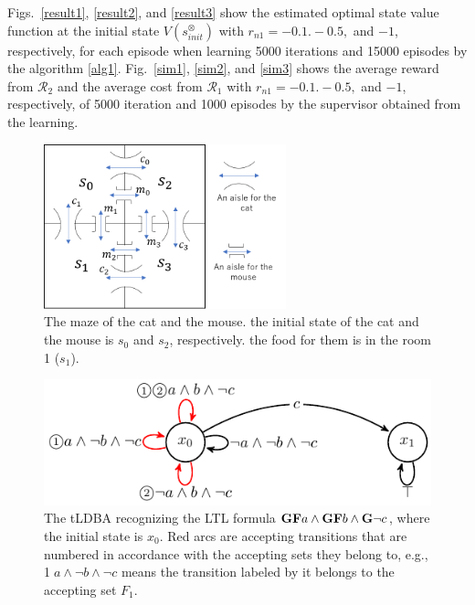 \documentclass[letterpaper, 10 pt, conference, dvipdfmx]{ieeeconf}
\begin{document}
Figs.\ \ref{result1}, \ref{result2}, and \ref{result3} show the estimated optimal state value function at the initial state $V(s^{\otimes}_{init})$ with $r_{n1} = -0.1. -0.5,$ and $-1$, respectively, for each episode when learning 5000 iterations and 15000 episodes by the algorithm \ref{alg1}.
Fig.\ \ref{sim1}, \ref{sim2}, and \ref{sim3} shows the average reward from $\mathcal{R}_2$ and the average cost from $\mathcal{R}_1$ with $r_{n1} = -0.1. -0.5,$ and $-1$, respectively, of 5000 iteration and 1000 episodes by the supervisor obtained from the learning.

\begin{figure}[htbp]
   \centering
   \vspace{2mm}
   \includegraphics[width=7cm]{cat_mouse.png}
   \caption{The maze of the cat and the mouse. the initial state of the cat and the mouse is $s_0$ and $s_2$, respectively. the food for them is in the room 1 ($s_1$).}
   \label{cat_mouse}
\end{figure}

\begin{figure}[htbp]
   \centering
   \vspace{2mm}
   \includegraphics[bb=0 0 247 80,scale=0.85]{ldgba_original.pdf}
   \caption{The tLDBA recognizing the LTL formula $\text{{\bf GF}}a \wedge \text{{\bf GF}}b \wedge \text{{\bf G}}\neg c$, where the initial state is $x_0$. Red arcs are accepting transitions that are numbered in accordance with the accepting sets they belong to, e.g., \textcircled{\scriptsize 1}$a \land \neg b \land \neg c$ means the transition labeled by it belongs to the accepting set $F_1$.}
   \label{tldba}
\end{figure}
\end{document}

